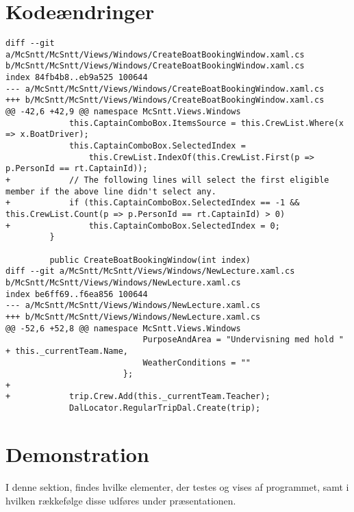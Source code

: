 \documentclass[a4paper,11pt,fleqn,twoside,openright,final]{memoir}
\begin{document}
\section{Kodeændringer}
\begin{lstlisting}[frame=single, caption=Forsidens Code-Behind, label=fntpg-cb]
diff --git a/McSntt/McSntt/Views/Windows/CreateBoatBookingWindow.xaml.cs b/McSntt/McSntt/Views/Windows/CreateBoatBookingWindow.xaml.cs
index 84fb4b8..eb9a525 100644
--- a/McSntt/McSntt/Views/Windows/CreateBoatBookingWindow.xaml.cs
+++ b/McSntt/McSntt/Views/Windows/CreateBoatBookingWindow.xaml.cs
@@ -42,6 +42,9 @@ namespace McSntt.Views.Windows
             this.CaptainComboBox.ItemsSource = this.CrewList.Where(x => x.BoatDriver);
             this.CaptainComboBox.SelectedIndex =
                 this.CrewList.IndexOf(this.CrewList.First(p => p.PersonId == rt.CaptainId));
+            // The following lines will select the first eligible member if the above line didn't select any.
+            if (this.CaptainComboBox.SelectedIndex == -1 && this.CrewList.Count(p => p.PersonId == rt.CaptainId) > 0) 
+                this.CaptainComboBox.SelectedIndex = 0;
         }
 
         public CreateBoatBookingWindow(int index)
diff --git a/McSntt/McSntt/Views/Windows/NewLecture.xaml.cs b/McSntt/McSntt/Views/Windows/NewLecture.xaml.cs
index be6ff69..f6ea856 100644
--- a/McSntt/McSntt/Views/Windows/NewLecture.xaml.cs
+++ b/McSntt/McSntt/Views/Windows/NewLecture.xaml.cs
@@ -52,6 +52,8 @@ namespace McSntt.Views.Windows
                            PurposeAndArea = "Undervisning med hold " + this._currentTeam.Name,
                            WeatherConditions = ""
                        };
+
+            trip.Crew.Add(this._currentTeam.Teacher);
             DalLocator.RegularTripDal.Create(trip);
\end{lstlisting}

\newpage
\section{Demonstration}

I denne sektion, findes hvilke elementer, der testes og vises af programmet, samt i hvilken rækkefølge disse udføres under præsentationen.
\end{document}
